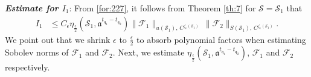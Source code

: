 \documentclass[11 pt]{amsart}
\newcommand{\norm}[1]{\lVert#1\rVert}
\theoremstyle{definition}
\numberwithin{equation}{section}
\begin{document}
\smallskip
\textbf{\emph{Estimate for $I_1$}}: From \eqref{for:227}, it follows from  Theorem \ref{th:7} for $\mathcal{S}=\mathcal{S}_1$ that
\begin{align}\label{for:232}
 I_1&\leq C_\epsilon \eta_{\frac{\epsilon}{2}}(\mathcal{S}_1, \mathfrak{a}^{t_{ \mathfrak{q}_1}-t_{ \mathfrak{q}_2}})\norm{\mathcal{F}_1}_{u(\mathcal{S}_1),\,C^{\zeta_\epsilon(\mathcal{S}_1)}}\,\big\|\mathcal{F}_2\big\|_{S(\mathcal{S}_1),\,C^{\zeta_\epsilon(\mathcal{S}_1)}}.
 \end{align}
 We point out that we shrink $\epsilon$ to $\frac{\epsilon}{2}$ to absorb polynomial factors when estimating Sobolev norms of  $\mathcal{F}_1$ and $\mathcal{F}_2$.
Next, we estimate $\eta_{\frac{\epsilon}{2}}(\mathcal{S}_1, \mathfrak{a}^{t_{ \mathfrak{q}_1}-t_{ \mathfrak{q}_2}})$,  $\mathcal{F}_1$ and $\mathcal{F}_2$ respectively.
\end{document}
